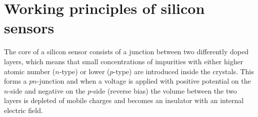 \section{Working principles of silicon sensors}

The core of a silicon sensor consists of a junction between two differently doped layers, which means that small concentrations of impurities with either higher atomic number ($n$-type) or lower ($p$-type) are introduced inside the crystals.
This forms a $pn$-junction and when a voltage is applied with positive potential on the $n$-side and negative on the $p$-side (reverse bias) the volume between the two layers is depleted of mobile charges and becomes an insulator with an internal electric field.



